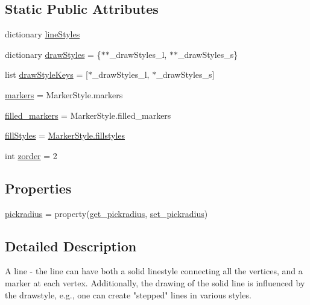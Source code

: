 \subsection*{Static Public Attributes}
\begin{DoxyCompactItemize}
\item 
dictionary \hyperlink{classmatplotlib_1_1lines_1_1Line2D_a6861cdd8231a22514747da3320b3efee}{line\+Styles}
\item 
dictionary \hyperlink{classmatplotlib_1_1lines_1_1Line2D_a9aac0ad781e63ac952df2c78ac474ee0}{draw\+Styles} = \{$\ast$$\ast$\+\_\+draw\+Styles\+\_\+l, $\ast$$\ast$\+\_\+draw\+Styles\+\_\+s\}
\item 
list \hyperlink{classmatplotlib_1_1lines_1_1Line2D_a88d7a59b0ec45d2176dfdf519bda8a08}{draw\+Style\+Keys} = \mbox{[}$\ast$\+\_\+draw\+Styles\+\_\+l, $\ast$\+\_\+draw\+Styles\+\_\+s\mbox{]}
\item 
\hyperlink{classmatplotlib_1_1lines_1_1Line2D_a18b9f0ec298fe37f84908d7ed49f4ad1}{markers} = Marker\+Style.\+markers
\item 
\hyperlink{classmatplotlib_1_1lines_1_1Line2D_a0117ed2c0e69f235b3ebb7cc37b7ba8d}{filled\+\_\+markers} = Marker\+Style.\+filled\+\_\+markers
\item 
\hyperlink{classmatplotlib_1_1lines_1_1Line2D_ad3dd9488a33b7fad9e8eb7569c0a69d0}{fill\+Styles} = \hyperlink{classmatplotlib_1_1markers_1_1MarkerStyle_afdd2d6b5d2416a69e548989c2b518da4}{Marker\+Style.\+fillstyles}
\item 
int \hyperlink{classmatplotlib_1_1lines_1_1Line2D_ac9a1785d97260c184c9c16879a467c24}{zorder} = 2
\end{DoxyCompactItemize}
\subsection*{Properties}
\begin{DoxyCompactItemize}
\item 
\hyperlink{classmatplotlib_1_1lines_1_1Line2D_ad384465e5db045c5caccc38bf84a2a8d}{pickradius} = property(\hyperlink{classmatplotlib_1_1lines_1_1Line2D_ad45a36309becae396671597a8d95f242}{get\+\_\+pickradius}, \hyperlink{classmatplotlib_1_1lines_1_1Line2D_a55175911cf70d74606fcefd4047c8321}{set\+\_\+pickradius})
\end{DoxyCompactItemize}


\subsection{Detailed Description}
\begin{DoxyVerb}A line - the line can have both a solid linestyle connecting all
the vertices, and a marker at each vertex.  Additionally, the
drawing of the solid line is influenced by the drawstyle, e.g., one
can create "stepped" lines in various styles.
\end{DoxyVerb}
 

